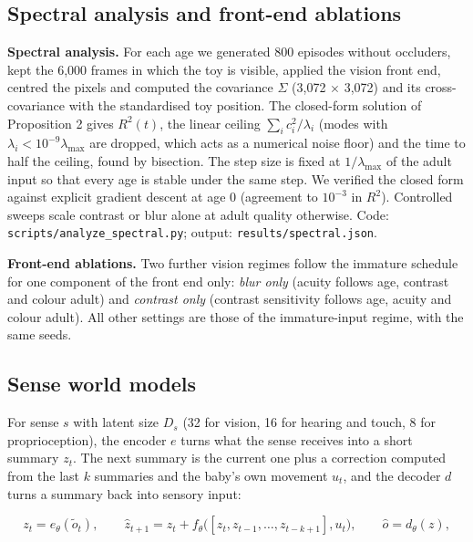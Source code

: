 \documentclass{article}
\begin{document}
\hypertarget{spectral-analysis-and-front-end-ablations}{%
\subsection{Spectral analysis and front-end ablations}\label{spectral-analysis-and-front-end-ablations}}

\textbf{Spectral analysis.} For each age we generated 800 episodes without occluders, kept the 6,000 frames in which the toy is visible, applied the vision front end, centred the pixels and computed the covariance \(\Sigma\) (3,072 \ensuremath{\times} 3,072) and its cross-covariance with the standardised toy position. The closed-form solution of Proposition 2 gives \(R^2(t)\), the linear ceiling \(\sum_i c_i^2/\lambda_i\) (modes with \(\lambda_i<10^{-9}\lambda_{\max}\) are dropped, which acts as a numerical noise floor) and the time to half the ceiling, found by bisection. The step size is fixed at \(1/\lambda_{\max}\) of the adult input so that every age is stable under the same step. We verified the closed form against explicit gradient descent at age 0 (agreement to \(10^{-3}\) in \(R^2\)). Controlled sweeps scale contrast or blur alone at adult quality otherwise. Code: \texttt{scripts/analyze\_spectral.py}; output: \texttt{results/spectral.json}.

\textbf{Front-end ablations.} Two further vision regimes follow the immature schedule for one component of the front end only: \emph{blur only} (acuity follows age, contrast and colour adult) and \emph{contrast only} (contrast sensitivity follows age, acuity and colour adult). All other settings are those of the immature-input regime, with the same seeds.

\hypertarget{sense-world-models}{%
\subsection{Sense world models}\label{sense-world-models}}

For sense \(s\) with latent size \(D_s\) (32 for vision, 16 for hearing and touch, 8 for proprioception), the encoder \(e\) turns what the sense receives into a short summary \(z_t\). The next summary is the current one plus a correction computed from the last \(k\) summaries and the baby's own movement \(u_t\), and the decoder \(d\) turns a summary back into sensory input:

\begin{equation}z_t=e_\theta(\tilde o_t),\qquad \hat z_{t+1}=z_t+f_\theta\big([z_t,z_{t-1},\dots,z_{t-k+1}],u_t\big),\qquad \hat o=d_\theta(z),\end{equation}
\end{document}
